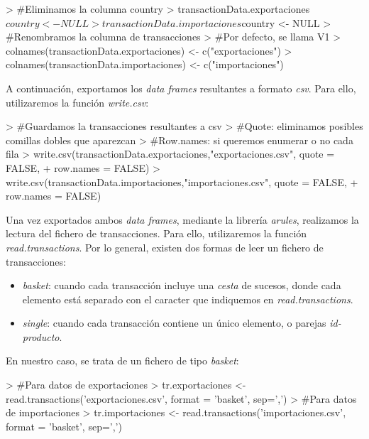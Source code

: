\documentclass [a4paper] {article}
\begin{document}
\begin{Schunk}
\begin{Sinput}
> #Eliminamos la columna country
> transactionData.exportaciones$country <- NULL
> transactionData.importaciones$country <- NULL
> #Renombramos la columna de transacciones
> #Por defecto, se llama V1
> colnames(transactionData.exportaciones) <- c("exportaciones")
> colnames(transactionData.importaciones) <- c("importaciones")
\end{Sinput}
\end{Schunk}

A continuación, exportamos los \textit{data frames} resultantes a formato \textit{csv}. Para ello, utilizaremos la función \textit{write.csv}:

\begin{Schunk}
\begin{Sinput}
> #Guardamos la transacciones resultantes a csv
> #Quote: eliminamos posibles comillas dobles que aparezcan
> #Row.names: si queremos enumerar o no cada fila
> write.csv(transactionData.exportaciones,"exportaciones.csv", quote = FALSE,
+ row.names = FALSE)
> write.csv(transactionData.importaciones,"importaciones.csv", quote = FALSE,
+ row.names = FALSE)
\end{Sinput}
\end{Schunk}
Una vez exportados ambos \textit{data frames}, mediante la librería \textit{arules}, realizamos la lectura del fichero de transacciones. Para ello, utilizaremos la función \textit{read.transactions}. Por lo general,
existen dos formas de leer un fichero de transacciones:

\begin{itemize}
    \item \textit{basket}: cuando cada transacción incluye una \textit{cesta} de sucesos, donde cada elemento está separado con el caracter que indiquemos en \textit{read.transactions}.
    \item \textit{single}: cuando cada transacción contiene un único elemento, o parejas \textit{id-producto}.
\end{itemize}

En nuestro caso, se trata de un fichero de tipo \textit{basket}:
\begin{Schunk}
\begin{Sinput}
> #Para datos de exportaciones
> tr.exportaciones <- read.transactions('exportaciones.csv', format = 'basket', sep=',')
> #Para datos de importaciones
> tr.importaciones <- read.transactions('importaciones.csv', format = 'basket', sep=',')
\end{Sinput}
\end{Schunk}
\end{document}
